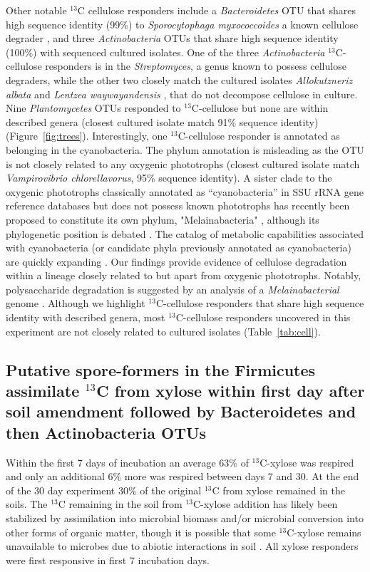 Other notable $^{13}$C cellulose responders include a \textit{Bacteroidetes}
OTU that shares high sequence identity (99\%) to \textit{Sporocytophaga
myxococcoides} a known cellulose degrader \citep{Vance_1980}, and three
\textit{Actinobacteria} OTUs that share high sequence identity (100\%) with
sequenced cultured isolates. One of the three \textit{Actinobacteria}
$^{13}$C-cellulose responders is in the \textit{Streptomyces}, a genus known to
possess cellulose degraders, while the other two closely match the cultured isolates
\textit{Allokutzneriz albata} \citep{Labeda_2008, Tomita_1993} and
\textit{Lentzea waywayandensis} \citep{LABEDA_1989, Labeda_2001}, that do not
decompose cellulose in culture. Nine \textit{Plantomycetes} OTUs responded to
$^{13}$C-cellulose but none are within described genera (closest cultured isolate
match 91\% sequence identity) (Figure~\ref{fig:trees}). Interestingly, one
$^{13}$C-cellulose responder is annotated as belonging in the
cyanobacteria. The phylum annotation is misleading as the OTU is not
closely related to any oxygenic phototrophs (closest cultured isolate match
\textit{Vampirovibrio chlorellavorus}, 95\% sequence identity). A sister clade
to the oxygenic phototrophs classically annotated as ``cyanobacteria'' in
SSU rRNA gene reference databases but does not possess known phototrophs has
recently been proposed to constitute its own phylum, "Melainabacteria"
\citet{Di_Rienzi_2013}, although its phylogenetic position is debated
\citep{Soo_2014}. The catalog of metabolic capabilities associated with
cyanobacteria (or candidate phyla previously annotated as
cyanobacteria) are quickly expanding \citep{Di_Rienzi_2013, Soo_2014}.
Our findings provide evidence of cellulose degradation within a lineage closely
related to but apart from oxygenic phototrophs. Notably, polysaccharide
degradation is suggested by an analysis of a \textit{Melainabacterial} genome
\citep{Di_Rienzi_2013}. Although we highlight $^{13}$C-cellulose responders
that share high sequence identity with described genera, most
$^{13}$C-cellulose responders uncovered in this experiment are not closely
related to cultured isolates (Table~\ref{tab:cell}).

\subsection{Putative spore-formers in the Firmicutes assimilate $^{13}$C from
xylose within first day after soil amendment followed by Bacteroidetes and then
Actinobacteria OTUs} 
Within the first 7 days of incubation an average 63\% of $^{13}$C-xylose was
respired and only an additional 6\% more was respired between days 7 and 30. At
the end of the 30 day experiment 30\% of the original $^{13}$C from xylose
remained in the soils. The $^{13}$C remaining in the soil from $^{13}$C-xylose
addition has likely been stabilized by assimilation into microbial biomass
and/or microbial conversion into other forms of organic matter, though it is
possible that some $^{13}$C-xylose remains unavailable to microbes due to
abiotic interactions in soil \citep{Kalbitz_2000}. All xylose
responders were first responsive in first 7 incubation days. 

